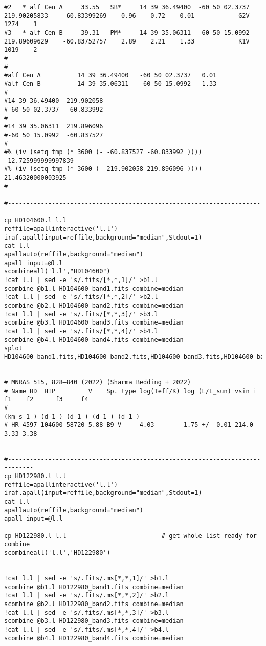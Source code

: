 \begin{verbatim}
#2   * alf Cen A     33.55   SB*     14 39 36.49400  -60 50 02.3737  219.90205833    -60.83399269    0.96    0.72    0.01            G2V     1274    1
#3   * alf Cen B     39.31   PM*     14 39 35.06311  -60 50 15.0992  219.89609629    -60.83752757    2.89    2.21    1.33            K1V     1019    2
#
#
#alf Cen A          14 39 36.49400   -60 50 02.3737   0.01 
#alf Cen B          14 39 35.06311   -60 50 15.0992   1.33 
#
#14 39 36.49400  219.902058
#-60 50 02.3737  -60.833992
#
#14 39 35.06311  219.896096
#-60 50 15.0992  -60.837527
#
#% (iv (setq tmp (* 3600 (- -60.837527 -60.833992 ))))   -12.725999999997839  
#% (iv (setq tmp (* 3600 (- 219.902058 219.896096 ))))   21.46320000003925  
#

#-----------------------------------------------------------------------------
cp HD104600.l l.l
reffile=apallinteractive('l.l')
iraf.apall(input=reffile,background="median",Stdout=1)
cat l.l
apallauto(reffile,background="median")
apall input=@l.l
scombineall('l.l',"HD104600")
!cat l.l | sed -e 's/.fits/[*,*,1]/' >b1.l
scombine @b1.l HD104600_band1.fits combine=median
!cat l.l | sed -e 's/.fits/[*,*,2]/' >b2.l
scombine @b2.l HD104600_band2.fits combine=median
!cat l.l | sed -e 's/.fits/[*,*,3]/' >b3.l
scombine @b3.l HD104600_band3.fits combine=median
!cat l.l | sed -e 's/.fits/[*,*,4]/' >b4.l
scombine @b4.l HD104600_band4.fits combine=median
splot HD104600_band1.fits,HD104600_band2.fits,HD104600_band3.fits,HD104600_band4.fits


# MNRAS 515, 828–840 (2022) (Sharma Bedding + 2022)
# Name HD  HIP         V    Sp. type log(Teff/K) log (L/L_sun) vsin i    f1    f2      f3     f4
#                                                                       (km s-1 ) (d-1 ) (d-1 ) (d-1 ) (d-1 )
# HR 4597 104600 58720 5.88 B9 V     4.03        1.75 +/- 0.01 214.0       3.33 3.38 - -


#-----------------------------------------------------------------------------
cp HD122980.l l.l
reffile=apallinteractive('l.l')
iraf.apall(input=reffile,background="median",Stdout=1)
cat l.l
apallauto(reffile,background="median")
apall input=@l.l

cp HD122980.l l.l                          # get whole list ready for combine
scombineall('l.l','HD122980')


!cat l.l | sed -e 's/.fits/.ms[*,*,1]/' >b1.l
scombine @b1.l HD122980_band1.fits combine=median
!cat l.l | sed -e 's/.fits/.ms[*,*,2]/' >b2.l
scombine @b2.l HD122980_band2.fits combine=median
!cat l.l | sed -e 's/.fits/.ms[*,*,3]/' >b3.l
scombine @b3.l HD122980_band3.fits combine=median
!cat l.l | sed -e 's/.fits/.ms[*,*,4]/' >b4.l
scombine @b4.l HD122980_band4.fits combine=median


\end{verbatim}
